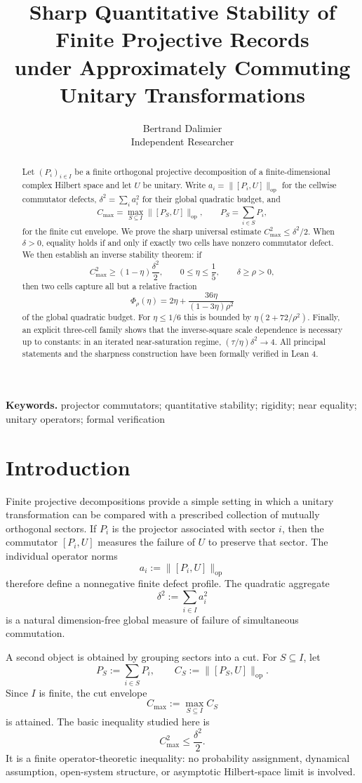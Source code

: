 \documentclass[11pt]{article}
\title{Sharp Quantitative Stability of Finite Projective Records\\
under Approximately Commuting Unitary Transformations}
\author{Bertrand Dalimier\\
Independent Researcher}
\date{}
\newcommand{\op}{\mathrm{op}}
\newcommand{\cmax}{C_{\max}}
\newcommand{\dd}{\delta}
\newcommand{\etaq}{\eta}
\newcommand{\tauq}{\tau}
\newcommand{\PhiRho}{\Phi_{\rho}}
\begin{document}
\maketitle

\begin{abstract}
Let $(P_i)_{i\in I}$ be a finite orthogonal projective decomposition of a
finite-dimensional complex Hilbert space and let $U$ be unitary.  Write
$a_i=\|[P_i,U]\|_{\op}$ for the cellwise commutator defects,
$\dd^2=\sum_i a_i^2$ for their global quadratic budget, and
\[
  \cmax=\max_{S\subseteq I}\|[P_S,U]\|_{\op},
  \qquad P_S=\sum_{i\in S}P_i ,
\]
for the finite cut envelope.  We prove the sharp universal estimate
$\cmax^2\le \dd^2/2$.  When $\dd>0$, equality holds if and only if exactly two
cells have nonzero commutator defect.  We then establish an inverse stability
theorem: if
\[
  \cmax^2\ge (1-\etaq)\frac{\dd^2}{2},\qquad
  0\le\etaq\le\frac15,\qquad \dd\ge\rho>0,
\]
then two cells capture all but a relative fraction
\[
  \PhiRho(\etaq)
  =2\etaq+\frac{36\etaq}{(1-3\etaq)\rho^2}
\]
of the global quadratic budget.  For $\etaq\le1/6$ this is bounded by
$\etaq(2+72/\rho^2)$.  Finally, an explicit three-cell family shows that the
inverse-square scale dependence is necessary up to constants: in an iterated
near-saturation regime, $(\tauq/\etaq)\dd^2\to4$.  All principal statements
and the sharpness construction have been formally verified in Lean 4.
\end{abstract}

\noindent\textbf{Keywords.}
projector commutators; quantitative stability; rigidity; near equality;
unitary operators; formal verification

\section{Introduction}

Finite projective decompositions provide a simple setting in which a unitary
transformation can be compared with a prescribed collection of mutually
orthogonal sectors.  If $P_i$ is the projector associated with sector $i$,
then the commutator $[P_i,U]$ measures the failure of $U$ to preserve that
sector.  The individual operator norms
\[
  a_i:=\|[P_i,U]\|_{\op}
\]
therefore define a nonnegative finite defect profile.  The quadratic aggregate
\[
  \dd^2:=\sum_{i\in I} a_i^2
\]
is a natural dimension-free global measure of failure of simultaneous
commutation.

A second object is obtained by grouping sectors into a cut.  For
$S\subseteq I$, let
\[
  P_S:=\sum_{i\in S}P_i,\qquad
  C_S:=\|[P_S,U]\|_{\op}.
\]
Since $I$ is finite, the cut envelope
\[
  \cmax:=\max_{S\subseteq I}C_S
\]
is attained.  The basic inequality studied here is
\begin{equation}\label{eq:envelope}
  \cmax^2\le \frac{\dd^2}{2}.
\end{equation}
It is a finite operator-theoretic inequality: no probability assignment,
dynamical assumption, open-system structure, or asymptotic Hilbert-space
limit is involved.
\end{document}
